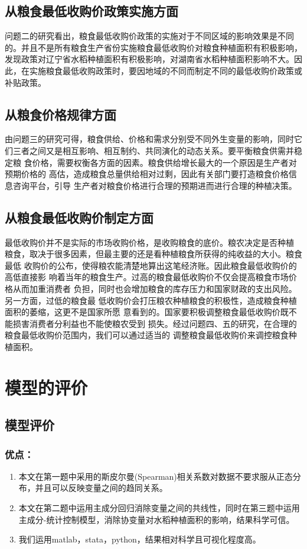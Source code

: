 \documentclass[withoutpreface,bwprint]{cumcmthesis} %
\begin{document}
\subsection{从粮食最低收购价政策实施方面}
问题二的研究看出，粮食最低收购价政策的实施对于不同区域的影响效果是不同的。并且不是所有粮食生产省份实施粮食最低收购价对粮食种植面积有积极影响，发现政策对辽宁省水稻种植面积有积极影响，对湖南省水稻种植面积影响不大。因此，在实施粮食最低收购政策时，要因地域的不同而制定不同的最低收购价政策或补贴政策。
\subsection{从粮食价格规律方面}
由问题三的研究可得，粮食供给、价格和需求分别受不同外生变量的影响，同时它 们三者之间又是相互影响、相互制约、共同演化的动态关系。要平衡粮食供需并稳定粮 食价格，需要权衡各方面的因素。粮食供给增长最大的一个原因是生产者对预期价格的 高估，造成粮食总量供给相对过剩，因此有关部门要打造粮食价格信息咨询平台，引导 生产者对粮食价格进行合理的预期进而进行合理的种植决策。
\subsection{从粮食最低收购价制定方面}
最低收购价并不是实际的市场收购价格，是收购粮食的底价。粮农决定是否种植 粮食，取决于很多因素，但最主要的还是看种植粮食所获得的纯收益的大小。粮食最低 收购价的公布，使得粮农能清楚地算出这笔经济账。因此粮食最低收购价的高低直接影 响着当年的粮食生产。过高的粮食最低收购价不仅会提高粮食市场价格从而加重消费者 负担，同时也会增加粮食的库存压力和国家财政的支出风险。另一方面，过低的粮食最 低收购价会打压粮农种植粮食的积极性，造成粮食种植面积的萎缩，这更不是国家所愿 意看到的。国家要积极调整粮食最低收购价既不能损害消费者分利益也不能使粮农受到 损失。经过问题四、五的研究，在合理的粮食最低收购价范围内，我们可以通过适当的 调整粮食最低收购价来调控粮食种植面积。



		\section{模型的评价}
		\subsection{模型评价}
		\subsubsection{优点：}\par
		\begin{enumerate}
		\item 本文在第一题中采用的斯皮尔曼(Spearman)相关系数对数据不要求服从正态分布，并且可以反映变量之间的趋同关系。
		\item 本文在第二题中运用主成分回归消除变量之间的共线性，同时在第三题中运用主成分-统计控制模型，消除协变量对水稻种植面积的影响，结果科学可信。
		\item 我们运用matlab，stata，python，结果相对科学且可视化程度高。
		\end{enumerate}
\end{document}
